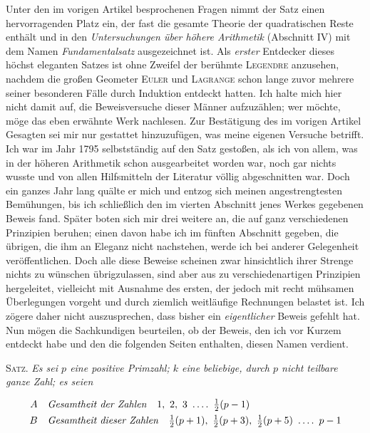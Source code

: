 Unter den im vorigen Artikel besprochenen Fragen nimmt der Satz einen hervorragenden Platz ein, der fast die gesamte Theorie der quadratischen Reste enthält und in den \emph{Untersuchungen über höhere Arithmetik} (Abschnitt IV) mit dem Namen \emph{Fundamentalsatz} ausgezeichnet ist. Als \emph{erster} Entdecker dieses höchst eleganten Satzes ist ohne Zweifel der berühmte \textsc{Legendre} anzusehen, nachdem die großen Geometer \textsc{Euler} und \textsc{Lagrange} schon lange zuvor mehrere seiner besonderen Fälle durch Induktion entdeckt hatten. Ich halte mich hier nicht damit auf, die Beweisversuche dieser Männer aufzuzählen; wer möchte, möge das eben erwähnte Werk nachlesen. Zur Bestätigung des im vorigen Artikel Gesagten sei mir nur gestattet hinzuzufügen, was meine eigenen Versuche betrifft. Ich war im Jahr 1795 selbstständig auf den Satz gestoßen, als ich von allem, was in der höheren Arithmetik schon ausgearbeitet worden war, noch gar nichts wusste und von allen Hilfsmitteln der Literatur völlig abgeschnitten war. Doch ein ganzes Jahr lang quälte er mich und entzog sich meinen angestrengtesten Bemühungen, bis ich schließlich den im vierten Abschnitt jenes Werkes gegebenen Beweis fand. Später boten sich mir drei weitere an, die auf ganz verschiedenen Prinzipien beruhen; einen davon habe ich im fünften Abschnitt gegeben, die übrigen, die ihm an Eleganz nicht nachstehen, werde ich bei anderer Gelegenheit veröffentlichen. Doch alle diese Beweise scheinen zwar hinsichtlich ihrer Strenge nichts zu wünschen übrigzulassen, sind aber aus zu verschiedenartigen Prinzipien hergeleitet, vielleicht mit Ausnahme des ersten, der jedoch mit recht mühsamen Überlegungen vorgeht und durch ziemlich weitläufige Rechnungen belastet ist. Ich zögere daher nicht auszusprechen, dass bisher ein \emph{eigentlicher} Beweis gefehlt hat. Nun mögen die Sachkundigen beurteilen, ob der Beweis, den ich vor Kurzem entdeckt habe und den die folgenden Seiten enthalten, diesen Namen verdient.


\textsc{Satz.} \emph{Es sei $p$ eine positive Primzahl; $k$ eine beliebige, durch $p$ nicht} \emph{teilbare ganze Zahl; es seien}

\[
\begin{aligned}
A &\quad \text{\emph{Gesamtheit der Zahlen}}\quad 1,\ 2,\ 3\ \dotsfour\ \tfrac12(p-1)\\
B &\quad \text{\emph{Gesamtheit dieser Zahlen}}\quad \tfrac12(p+1),\ \tfrac12(p+3),\ \tfrac12(p+5)\ \dotsfour\ p-1
\end{aligned}
\]

